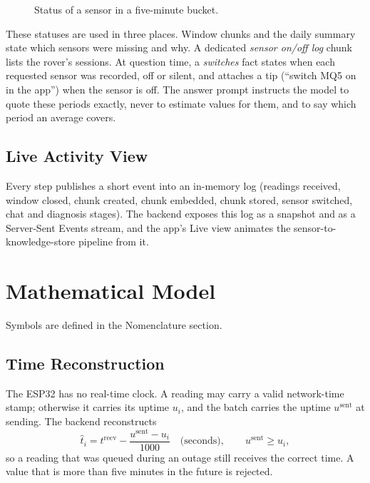 \begin{figure}[H]
\centering

\caption{Status of a sensor in a five-minute bucket.}
\label{fig:statesensor}
\end{figure}

These statuses are used in three places. Window chunks and the daily summary state which sensors were missing and why. A
dedicated \emph{sensor on/off log} chunk lists the rover's sessions. At question time, a \emph{switches} fact states when
each requested sensor was recorded, off or silent, and attaches a tip (``switch MQ5 on in the app'') when the sensor is off. The
answer prompt instructs the model to quote these periods exactly, never to estimate values for them, and to say which period an
average covers.

\subsection{Live Activity View}

Every step publishes a short event into an in-memory log (readings received, window closed, chunk created, chunk embedded, chunk
stored, sensor switched, chat and diagnosis stages). The backend exposes this log as a snapshot and as a Server-Sent Events
stream, and the app's Live view animates the sensor-to-knowledge-store pipeline from it.

\section{Mathematical Model}

Symbols are defined in the Nomenclature section.

\subsection{Time Reconstruction}

The ESP32 has no real-time clock. A reading may carry a valid network-time stamp; otherwise it carries its uptime $u_i$, and the
batch carries the uptime $u^{\mathrm{sent}}$ at sending. The backend reconstructs
\begin{equation}
\hat t_i = t^{\mathrm{recv}} - \frac{u^{\mathrm{sent}} - u_i}{1000}\quad\text{(seconds)},\qquad u^{\mathrm{sent}}\ge u_i,
\label{eq:time}
\end{equation}
so a reading that was queued during an outage still receives the correct time. A value that is more than five minutes in the
future is rejected.

